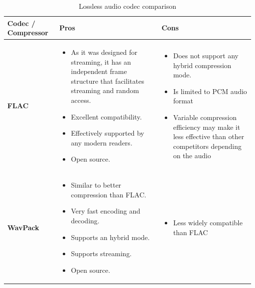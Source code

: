 \begin{table}[htbp]
    \centering
    \caption{Lossless audio codec comparison}
    \label{tab:lossless-codecs}

    \renewcommand{\arraystretch}{1.3}
    \setlength{\tabcolsep}{6pt}

    \begin{tabularx}{\textwidth}{
        @{}
        >{\raggedright\arraybackslash}p{}
        >{\raggedright\arraybackslash}X
        >{\raggedright\arraybackslash}X
        @{}
    }
        \toprule
        \textbf{Codec / Compressor} & \textbf{Pros} & \textbf{Cons} \\
        \midrule

        \textbf{FLAC}
        &
        \begin{itemize}[leftmargin=*, nosep]
            \item As it was designed for streaming, it has an independent frame structure that facilitates streaming and random access.
            \item Excellent compatibility.
            \item Effectively supported by any modern readers.
            \item Open source.
        \end{itemize}
        &
        \begin{itemize}[leftmargin=*, nosep]
            \item Does not support any hybrid compression mode.
            \item Is limited to PCM audio format
            \item Variable compression efficiency may make it less effective than other competitors depending on the audio
        \end{itemize}
        \\

        \addlinespace
        \midrule

        \textbf{WavPack}
        &
        \begin{itemize}[leftmargin=*, nosep]
            \item Similar to better compression than FLAC.
            \item Very fast encoding and decoding.
            \item Supports an hybrid mode.
            \item Supports streaming.
            \item Open source.
        \end{itemize}
        &
        \begin{itemize}[leftmargin=*, nosep]
            \item Less widely compatible than FLAC
        \end{itemize}
        \\


\end{tabularx}
\end{table}
